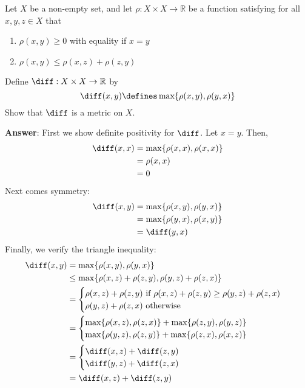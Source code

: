 \begin{exm}
	Let $X$ be a non-empty set, and let $\rho:X \times X \to \mathbb{R}$ be a function
	satisfying for all $x,y,z\in X$ that
	\begin{enumerate}
		\item $\rho(x,y)\geq0$ with equality if $x=y$
		\item $\rho(x,y)\leq\rho(x,z)+\rho(z,y)$
	\end{enumerate}
	Define $\diff: X \times X \to \mathbb{R}$ by
	\begin{equation*}
		\diff(x,y)\defines \max\{\rho(x,y),\rho(y,x)\}
	\end{equation*}
	Show that $\diff$ is a metric on $X$.
	\begin{flushleft}
		\textbf{Answer}: First we show definite positivity for $\diff$. Let $x=y$. Then,
		\begin{align*}
			\diff(x,x) & = \max\{\rho(x,x),\rho(x,x)\} \\
			           & = \rho(x,x)                   \\
			           & = 0
		\end{align*}
		Next comes symmetry:
		\begin{align*}
			\diff(x,y) & = \max\{\rho(x,y),\rho(y,x)\}  \\
			           & = \max\{\rho(y,x), \rho(x,y)\} \\
			           & = \diff(y,x)
		\end{align*}
		Finally, we verify the triangle inequality:
		\begin{align*}
			\diff(x,y) & = \max\{\rho(x,y),\rho(y,x)\}                        \\
			           & \leq \max\{\rho(x,z)+\rho(z,y),\rho(y,z)+\rho(z,x)\} \\
			           & = \begin{cases}
				\rho(x,z)+\rho(z,y)\text{ if } \rho(x,z)+\rho(z,y) \geq \rho(y,z)+\rho(z,x) \\
				\rho(y,z)+\rho(z,x)\text{ otherwise}
			\end{cases}                         \\
			           & = \begin{cases}
				\max\{\rho(x,z),\rho(z,x)\}+\max\{\rho(z,y),\rho(y,z)\} \\
				\max\{\rho(y,z),\rho(z,y)\}+\max\{\rho(z,x),\rho(x,z)\}
			\end{cases}                         \\
			           & = \begin{cases}
				\diff(x,z)+\diff(z,y) \\
				\diff(y,z)+\diff(z,x)
			\end{cases}                         \\
			           & = \diff(x,z)+\diff(z,y)
		\end{align*}
	\end{flushleft}
\end{exm}

